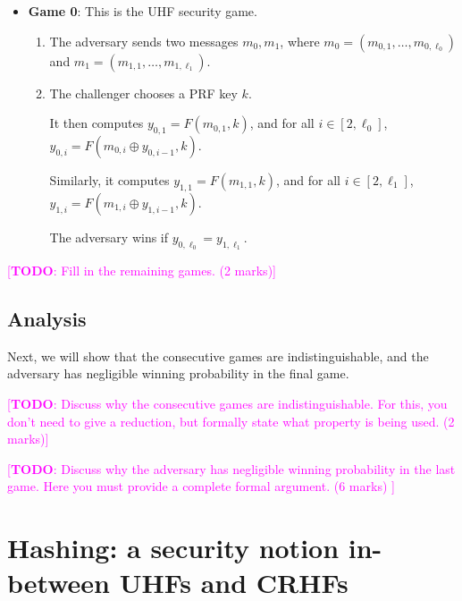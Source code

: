 \documentclass[10pt,addpoints]{exam}
\newcommand{\TODO}[1]{\textcolor{magenta}{[\textbf{TODO}: #1]}}
\theoremstyle{definition}
\begin{document}
    \begin{itemize}
        \item \textbf{Game 0}: This is the UHF security game. 

        \begin{enumerate}
            \item The adversary sends two messages $m_0, m_1$, where $m_0 = (m_{0,1}, \ldots, m_{0, \ell_0})$ and $m_1 = (m_{1,1}, \ldots, m_{1,\ell_1})$.

            \item The challenger chooses a PRF key $k$. 

            It then computes $y_{0,1} = F(m_{0,1}, k)$, and for all $i \in [2, \ell_0]$, $y_{0,i} = F(m_{0, i} \oplus y_{0,i-1}, k)$. 

            Similarly, it computes $y_{1,1} = F(m_{1,1}, k)$, and for all $i \in [2, \ell_1]$, $y_{1,i} = F(m_{1, i} \oplus y_{1,i-1}, k)$. 

            The adversary wins if $y_{0, \ell_0} = y_{1, \ell_1}$. 
        \end{enumerate}
    \end{itemize}

    \noindent\TODO{Fill in the remaining games. (2 marks)}

    \subsection{Analysis}

    Next, we will show that the consecutive games are indistinguishable, and the adversary has negligible winning probability in the final game. 

    \vspace{10pt}

    \noindent \TODO{Discuss why the consecutive games are indistinguishable. For this, you don't need to give a reduction, but formally state what property is being used. (2 marks)}

    \vspace{10pt}

    \noindent \TODO{Discuss why the adversary has negligible winning probability in the last game. Here you must provide a complete formal argument. (6 marks) }



    \newpage
 
    \color{blue}

    \section{Hashing: a security notion in-between UHFs and CRHFs}
\end{document}
